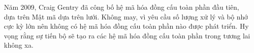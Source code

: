 Năm 2009, Craig Gentry đã công bố hệ mã hóa đồng cấu toàn phần đầu tiên,
dựa trên Mật mã dựa trên lưới. Không may, vì yêu cầu số lượng xử lý và bộ nhớ cực kỳ lớn nên không có
hệ mã hóa đồng cấu toàn phần nào được phát triển. Hy vọng rằng
sự tiến bộ sẽ tạo ra các hệ mã hóa đồng cấu toàn phần
trong tương lai không xa.

